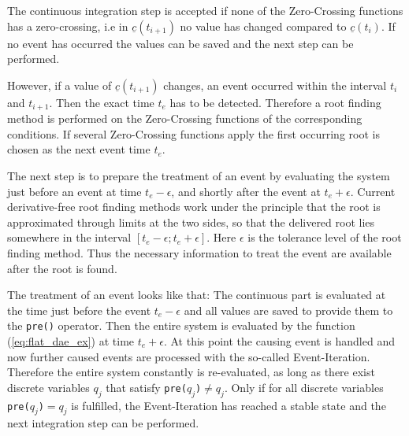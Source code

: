The continuous integration step is accepted if none of the
Zero-Crossing functions has a zero-crossing, i.e in $\underline{c}(t_{i+1})$ no
value has changed compared to $\underline{c}(t_i)$.
If no event has occurred the values can be saved and the next step can be performed.

However, if a value of $\underline{c}(t_{i+1})$ changes, an event occurred
within the interval $t_i$ and $ t_{i+1}$. Then the exact time $t_e$ has to be
detected. Therefore a root finding method is performed on the Zero-Crossing
functions of the corresponding conditions. If several Zero-Crossing functions
apply the first occurring root is chosen as the next event time $t_e$.

The next step is to prepare the treatment of an event by evaluating the system
just before an event at time $t_e - \epsilon $, and shortly after the event at $t_e +
\epsilon$. Current derivative-free root finding methods work under the
principle that the root is approximated through limits at the two sides,
so that the delivered root lies somewhere in the interval $[t_e - \epsilon;
t_e + \epsilon]$. Here $\epsilon$ is the tolerance level of the root finding
method. Thus the necessary information to treat the event are available after
the root is found.

The treatment of an event looks like that: The continuous part is evaluated at
the time just before the event $t_e - \epsilon$ and all values are saved to provide
them to the \verb+pre()+ operator. Then the entire system is evaluated
by the function (\ref{eq:flat_dae_ex}) at time $t_e + \epsilon$.
At this point the causing event is handled and now further caused events are
processed with the so-called Event-Iteration. Therefore the entire system
constantly is re-evaluated, as long as there exist discrete variables $q_j$
that satisfy \verb+pre(+$q_j$\verb+)+$\neq q_j$.  Only if for all discrete
variables \verb+pre(+$q_j$\verb+)+$ = q_j$ is fulfilled, the Event-Iteration
has reached a stable state and the next integration step can be performed.


